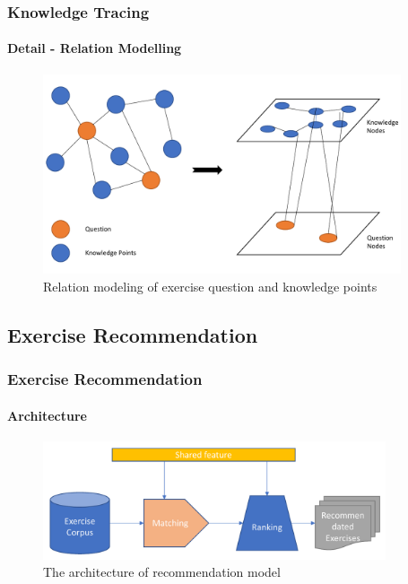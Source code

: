 \documentclass{beamer}
\begin{document}
\begin{frame}
	\frametitle{Knowledge Tracing}
	\framesubtitle{Detail - Relation Modelling}
	\begin{figure}
		\centering
		\includegraphics[width=0.94\textwidth]{figures/ch3-gat-kq.pdf}
		\caption{Relation modeling of exercise question and knowledge points}
	\end{figure}
\end{frame}







\subsection{Exercise Recommendation}
\begin{frame}
	\frametitle{Exercise Recommendation}
	\framesubtitle{Architecture}
	\begin{figure}
		\includegraphics[width=0.9\textwidth]{figures/ch4-ov.pdf}
		\caption{The architecture of recommendation model}
	\end{figure}
\end{frame}
\end{document}
